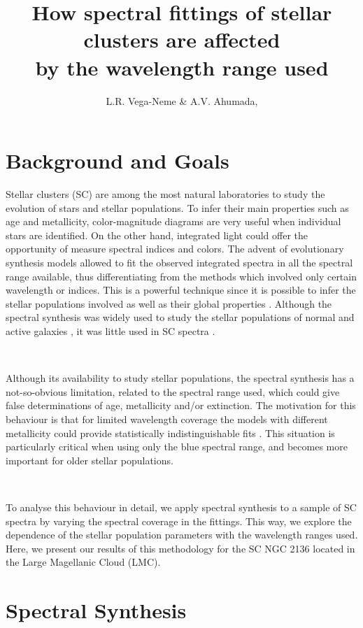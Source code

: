 \documentclass[baaa]{baaa}
\title{How spectral fittings of stellar clusters are affected \\
by the wavelength range used}
\author{
L.R. Vega-Neme\inst{1,2} \& A.V. Ahumada\inst{1},
}
\institute{
Observatorio Astron\'omico de C\'ordoba, UNC, Argentina
\and
Instituto de Astronom\'ia Te\'orica y Experimental, CONICET--UNC, Argentina
}
\begin{document}
\maketitle
\section{Background and Goals}\label{bkg}

Stellar clusters (SC) are among the most natural laboratories to study the evolution of stars and stellar populations. To infer their main properties such as age and metallicity, color-magnitude diagrams are very useful when individual stars are identified. On the other hand, integrated light could offer the opportunity of measure spectral indices and colors. The advent of evolutionary synthesis models allowed to fit the observed integrated spectra in all the spectral range available, thus differentiating from the methods which involved only certain wavelength or indices. This is a powerful technique since it is possible to infer the stellar populations involved as well as their global properties \citep{Cid}. Although the spectral synthesis was widely used to study the stellar populations of normal and active galaxies \citep{Tesis}, it was little used in SC spectra \citep{Andrea}.

\

Although its availability to study stellar populations, the spectral synthesis has a not-so-obvious limitation, related to the spectral range used, which could give false determinations of age, metallicity and/or extinction. The motivation for this behaviour is that for limited wavelength coverage the models with different metallicity could provide statistically indistinguishable fits \citep{CR2010a}. This situation is particularly critical when using only the blue spectral range, and becomes more important for older stellar populations.

\

To analyse this behaviour in detail, we apply spectral synthesis to a sample of SC spectra by varying the spectral coverage in the fittings. This way, we explore the dependence of the stellar population parameters with the wavelength ranges used. Here, we present our results of this methodology for the SC NGC 2136 located in the Large Magellanic Cloud (LMC).

\section{Spectral Synthesis}
\end{document}
